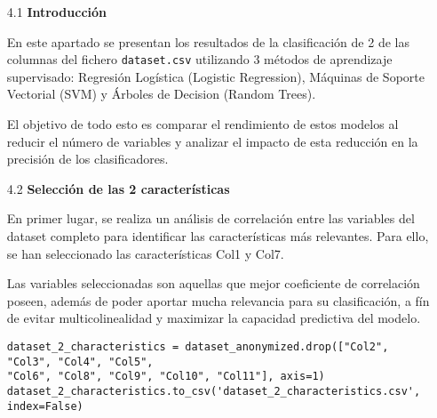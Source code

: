 \documentclass{article}
\begin{document}
\bigskip

\begin{itemize}

\item[4.1]  {\bf Introducci\'on}

En este apartado se presentan los resultados de la clasificaci\'on de 2 de las columnas del fichero \texttt{dataset.csv} utilizando 3 m\'etodos de aprendizaje supervisado: Regresi\'on Log\'istica (Logistic Regression), M\'aquinas de Soporte Vectorial (SVM) y \'Arboles de Decision (Random Trees).

El objetivo de todo esto es comparar el rendimiento de estos modelos al reducir el n\'umero de variables y analizar el impacto de esta reducci\'on en la precisi\'on de los clasificadores.

\end{itemize}

\bigskip

\begin{itemize}

\item[4.2]  {\bf Selecci\'on de las 2 caracter\'isticas}

En primer lugar, se realiza un análisis de correlaci\'on entre las variables del dataset completo para identificar las caracter\'isticas más relevantes. Para ello, se han seleccionado las caracter\'isticas Col1 y Col7.

Las variables seleccionadas son aquellas que mejor coeficiente de correlaci\'on poseen, adem\'as de poder aportar mucha relevancia para su clasificaci\'on, a f\'in de evitar multicolinealidad y maximizar la capacidad predictiva del modelo.

\begin{tcolorbox}[width=14cm]
\begin{scriptsize}
\begin{verbatim}
dataset_2_characteristics = dataset_anonymized.drop(["Col2", "Col3", "Col4", "Col5",
"Col6", "Col8", "Col9", "Col10", "Col11"], axis=1)
dataset_2_characteristics.to_csv('dataset_2_characteristics.csv', index=False)
\end{verbatim}
\end{scriptsize}
\end{tcolorbox}

\end{itemize}

\bigskip
\end{document}
